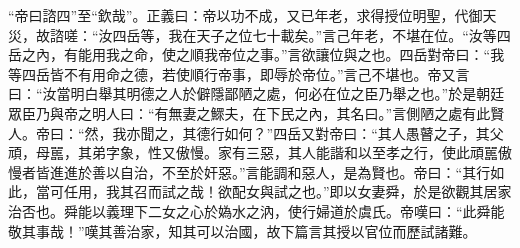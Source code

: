 {\noindent\shu{}\fzkt “帝曰諮四”至“欽哉”。正義曰：帝以功不成，又已年老，求得授位明聖，代御天災，故諮嗟：“汝四岳等，我在天子之位七十載矣。”言己年老，不堪在位。“汝等四岳之內，有能用我之命，使之順我帝位之事。”言欲讓位與之也。四岳對帝曰：“我等四岳皆不有用命之德，若使順行帝事，即辱於帝位。”言己不堪也。帝又言曰：“汝當明白舉其明德之人於僻隱鄙陋之處，何必在位之臣乃舉之也。”於是朝廷眾臣乃與帝之明人曰：“有無妻之鰥夫，在下民之內，其名曰。”言側陋之處有此賢人。帝曰：“然，我亦聞之，其德行如何？”四岳又對帝曰：“其人愚瞽之子，其父頑，母嚚，其弟字象，性又傲慢。家有三惡，其人能諧和以至孝之行，使此頑嚚傲慢者皆進進於善以自治，不至於奸惡。”言能調和惡人，是為賢也。帝曰：“其行如此，當可任用，我其召而試之哉！欲配女與試之也。”即以女妻舜，於是欲觀其居家治否也。舜能以義理下二女之心於媯水之汭，使行婦道於虞氏。帝嘆曰：“此舜能敬其事哉！”嘆其善治家，知其可以治國，故下篇言其授以官位而歷試諸難。 \par}


